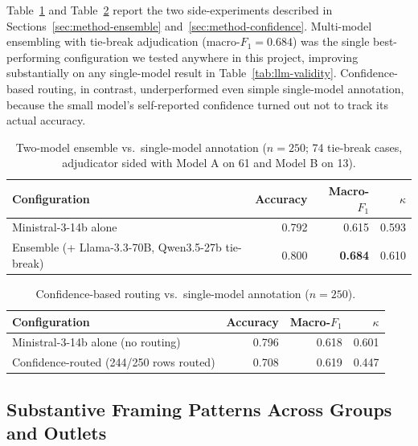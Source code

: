 \documentclass[a4paper,oneside,bibliography=totoc]{scrartcl}
\begin{document}
Table~\ref{tab:ensemble} and Table~\ref{tab:confidence} report the two side-experiments described in Sections~\ref{sec:method-ensemble} and~\ref{sec:method-confidence}. Multi-model ensembling with tie-break adjudication (macro-$F_1 = 0.684$) was the single best-performing configuration we tested anywhere in this project, improving substantially on any single-model result in Table~\ref{tab:llm-validity}. Confidence-based routing, in contrast, underperformed even simple single-model annotation, because the small model's self-reported confidence turned out not to track its actual accuracy.

\begin{table}[htbp]
\centering
\begin{tabular}{lrrr}
\toprule
\textbf{Configuration} & \textbf{Accuracy} & \textbf{Macro-$F_1$} & \textbf{$\kappa$} \\
\midrule
Ministral-3-14b alone & 0.792 & 0.615 & 0.593 \\
Ensemble (+ Llama-3.3-70B, Qwen3.5-27b tie-break) & 0.800 & \textbf{0.684} & 0.610 \\
\bottomrule
\end{tabular}
\caption{Two-model ensemble vs.\ single-model annotation ($n=250$; 74 tie-break cases, adjudicator sided with Model A on 61 and Model B on 13).}
\label{tab:ensemble}
\end{table}

\begin{table}[htbp]
\centering
\begin{tabular}{lrrr}
\toprule
\textbf{Configuration} & \textbf{Accuracy} & \textbf{Macro-$F_1$} & \textbf{$\kappa$} \\
\midrule
Ministral-3-14b alone (no routing) & 0.796 & 0.618 & 0.601 \\
Confidence-routed (244/250 rows routed) & 0.708 & 0.619 & 0.447 \\
\bottomrule
\end{tabular}
\caption{Confidence-based routing vs.\ single-model annotation ($n=250$).}
\label{tab:confidence}
\end{table}

\subsection{Substantive Framing Patterns Across Groups and Outlets}
\label{sec:results-substantive}
\end{document}
